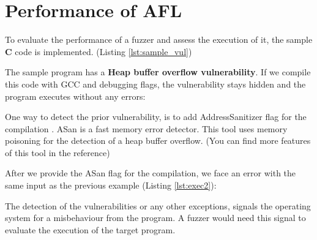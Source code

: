 \section{Performance of AFL} \label{sec:2.3}

To evaluate the performance of a fuzzer and assess the execution of it, the sample \textbf{C} code is implemented. (Listing \ref{lst:sample_vul}) \cite{sample_code_ref}



The sample program has a \textbf{Heap buffer overflow vulnerability}. If we compile this code with GCC and debugging flags, the vulnerability stays hidden and the program executes without any errors:



One way to detect the prior vulnerability, is to add AddressSanitizer flag for the compilation \cite{address_san}. ASan is a fast memory error detector. This tool uses memory poisoning for the detection of a heap buffer overflow. (You can find more features of this tool in the reference) \cite{serebryany2012addresssanitizer}

After we provide the ASan flag for the compilation, we face an error with the same input as the previous example (Listing \ref{lst:exec2}):



The detection of the vulnerabilities or any other exceptions, signals the operating system for a misbehaviour from the program. A fuzzer would need this signal to evaluate the execution of the target program.
